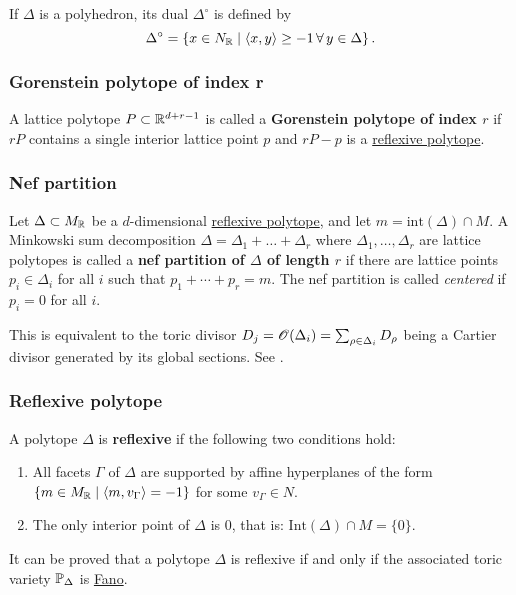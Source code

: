 \documentclass[11pt, english]{article}
\begin{document}
If $\Delta$ is a polyhedron, its dual $\Delta^\circ$ is defined by
\[
\Delta^\circ = \left\{ x \in N_{\mathbb{R}} \mid \langle x,y\rangle \geq -1 \,\forall \, y \in \Delta \right\}.
\]

\subsubsection{Gorenstein polytope of index r}
\label{gorensteinpolytope}
A lattice polytope $P \subset \mathbb{R}^{d+r-1}$ is called a \textbf{Gorenstein polytope of index $r$} if $rP$ contains a single interior lattice point $p$ and $rP-p$ is a \hyperref[reflexivepolytope]{reflexive polytope}.

\subsubsection{Nef partition}
\label{nefpartition}
Let $\Delta \subset M_{\mathbb{R}}$ be a $d$-dimensional \hyperref[reflexivepolytope]{reflexive polytope}, and let $m=\mathrm{int}(\Delta) \cap M$. A Minkowski sum decomposition $\Delta=\Delta_1+\dotsc +\Delta_r$ where $\Delta_1,\ldots,\Delta_r$ are lattice polytopes is called a \textbf{nef partition of $\Delta$ of length $r$} if there are lattice points $p_i \in \Delta_i$ for all $i$ such that $p_1+\cdots+p_r = m$. The nef partition is called \emph{centered} if $p_i=0$  for all $i$. 

This is equivalent to the toric divisor $D_j=\operatorname{\mathscr{O}}(\Delta_i)=\sum_{\rho \in \Delta_i} D_\rho$ being a Cartier divisor generated by its global sections. See \cite[Chapter 4.3]{mirrorsymalggeo}.  

\subsubsection{Reflexive polytope}
\label{reflexivepolytope}

A polytope $\Delta$ is \textbf{reflexive} if the following two conditions hold:
\begin{enumerate}
\item All facets $\Gamma$ of $\Delta$ are supported by affine hyperplanes of the form $\{ m \in M_{\mathbb{R}} \mid \langle m,v_\Gamma \rangle = -1 \}$ for some $v_\Gamma \in N$.
\item The only interior point of $\Delta$ is $0$, that is: $\mathrm{Int}(\Delta) \cap M = \{0\}$.
\end{enumerate}

It can be proved that a polytope $\Delta$ is reflexive if and only if the associated toric variety $\mathbb{P}_\Delta$ is \hyperref[fano]{Fano}.
\end{document}
